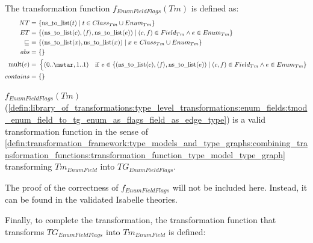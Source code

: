 \begin{defin}
\label{defin:library_of_transformations:type_level_transformations:enum_fields:tmod_enum_field_to_tg_enum_as_flags_field_as_edge_type}
The transformation function $f_{EnumFieldFlags}(Tm)$ is defined as:
\begin{align*}
NT =\ &\{\mathrm{ns\_\!to\_\!list}(t) \mid t \in Class_{Tm} \cup Enum_{Tm}\}\\
ET =\ &\{(\mathrm{ns\_\!to\_\!list}(c), \langle f \rangle, \mathrm{ns\_\!to\_\!list}(e)) \mid (c, f) \in Field_{Tm} \land e \in Enum_{Tm}\} \\
\!\!\sqsubseteq\ =\ &\{(\mathrm{ns\_\!to\_\!list}(x), \mathrm{ns\_\!to\_\!list}(x)) \mid x \in Class_{Tm} \cup Enum_{Tm} \}\\
abs =\ &\{\}\ \\
\mathrm{mult}(e) =\ &\begin{cases}
    (0..\mstar, 1..1) &\mathrm{if}\ e \in \{(\mathrm{ns\_\!to\_\!list}(c), \langle f \rangle, \mathrm{ns\_\!to\_\!list}(e)) \mid (c, f) \in Field_{Tm} \land e \in Enum_{Tm}\}
\end{cases} \\
contains =\ &\{\}
\end{align*}
\end{defin}

\begin{thm}
\label{defin:library_of_transformations:type_level_transformations:enum_fields:tmod_enum_field_to_tg_enum_as_flags_field_as_edge_type_func}
$f_{EnumFieldFlags}(Tm)$ (\cref{defin:library_of_transformations:type_level_transformations:enum_fields:tmod_enum_field_to_tg_enum_as_flags_field_as_edge_type}) is a valid transformation function in the sense of \cref{defin:transformation_framework:type_models_and_type_graphs:combining_transformation_functions:transformation_function_type_model_type_graph} transforming $Tm_{EnumField}$ into $TG_{EnumFieldFlags}$.
\end{thm}

The proof of the correctness of $f_{EnumFieldFlags}$ will not be included here. Instead, it can be found in the validated Isabelle theories.

Finally, to complete the transformation, the transformation function that transforms $TG_{EnumFieldFlags}$ into $Tm_{EnumField}$ is defined:

